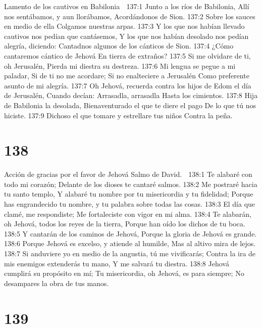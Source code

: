 Lamento de los cautivos en Babilonia 

137:1 Junto a los ríos de Babilonia, 
Allí nos sentábamos, y aun llorábamos, 
Acordándonos de Sion. 
137:2 Sobre los sauces en medio de ella 
Colgamos nuestras arpas. 
137:3 Y los que nos habían llevado cautivos nos pedían que cantásemos, 
Y los que nos habían desolado nos pedían alegría, diciendo: 
Cantadnos algunos de los cánticos de Sion. 
137:4 ¿Cómo cantaremos cántico de Jehová 
En tierra de extraños? 
137:5 Si me olvidare de ti, oh Jerusalén, 
Pierda mi diestra su destreza. 
137:6 Mi lengua se pegue a mi paladar, 
Si de ti no me acordare; 
Si no enalteciere a Jerusalén 
Como preferente asunto de mi alegría. 
137:7 Oh Jehová, recuerda contra los hijos de Edom el día de Jerusalén, 
Cuando decían: Arrasadla, arrasadla 
Hasta los cimientos. 
137:8 Hija de Babilonia la desolada, 
Bienaventurado el que te diere el pago 
De lo que tú nos hiciste. 
137:9 Dichoso el que tomare y estrellare tus niños 
Contra la peña. 

\chapter{138}

Acción de gracias por el favor de Jehová 
Salmo de David. 

138:1 Te alabaré con todo mi corazón; 
Delante de los dioses te cantaré salmos. 
138:2 Me postraré hacia tu santo templo, 
Y alabaré tu nombre por tu misericordia y tu fidelidad; 
Porque has engrandecido tu nombre, y tu palabra sobre todas las cosas. 
138:3 El día que clamé, me respondiste; 
Me fortaleciste con vigor en mi alma. 
138:4 Te alabarán, oh Jehová, todos los reyes de la tierra, 
Porque han oído los dichos de tu boca. 
138:5 Y cantarán de los caminos de Jehová, 
Porque la gloria de Jehová es grande. 
138:6 Porque Jehová es excelso, y atiende al humilde, 
Mas al altivo mira de lejos. 
138:7 Si anduviere yo en medio de la angustia, tú me vivificarás; 
Contra la ira de mis enemigos extenderás tu mano, 
Y me salvará tu diestra. 
138:8 Jehová cumplirá su propósito en mí; 
Tu misericordia, oh Jehová, es para siempre; 
No desampares la obra de tus manos. 

\chapter{139}

